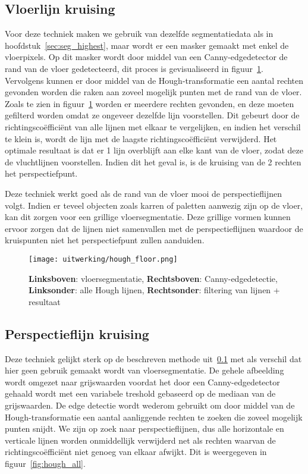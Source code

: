 \subsection{Vloerlijn kruising}\label{sec:hough_floor}
Voor deze techniek maken we gebruik van dezelfde segmentatiedata als in hoofdstuk~\ref{sec:seg_highest}, maar wordt er een masker gemaakt met enkel de vloerpixels.
Op dit masker wordt door middel van een Canny-edgedetector de rand van de vloer gedetecteerd, dit proces is gevisualiseerd in figuur~\ref{fig:hough_floor}.
Vervolgens kunnen er door middel van de Hough-transformatie een aantal rechten gevonden worden die raken aan zoveel mogelijk punten met de rand van de vloer.
Zoals te zien in figuur~\ref{fig:hough_floor} worden er meerdere rechten gevonden, en deze moeten gefilterd worden omdat ze ongeveer dezelfde lijn voorstellen.
Dit gebeurt door de richtingsco\"{e}ffici\"{e}nt van alle lijnen met elkaar te vergelijken, en indien het verschil te klein is, wordt de lijn met de laagste
richtingsco\"{e}ffici\"{e}nt verwijderd.
Het optimale resultaat is dat er 1 lijn overblijft aan elke kant van de vloer, zodat deze de vluchtlijnen voorstellen.
Indien dit het geval is, is de kruising van de 2 rechten het perspectiefpunt.

Deze techniek werkt goed als de rand van de vloer mooi de perspectieflijnen volgt.
Indien er teveel objecten zoals karren of paletten aanwezig zijn op de vloer, kan dit zorgen voor een grillige vloersegmentatie.
Deze grillige vormen kunnen ervoor zorgen dat de lijnen niet samenvallen met de perspectieflijnen waardoor de kruispunten niet het perspectiefpunt zullen aanduiden.

\begin{figure}
    \texttt{[image: uitwerking/hough\_floor.png]}
    \caption{\textbf{Linksboven}: vloersegmentatie, \textbf{Rechtsboven}: Canny-edgedetectie, \textbf{Linksonder}: alle Hough lijnen, \textbf{Rechtsonder}: filtering van lijnen + resultaat}
    \label{fig:hough_floor}
\end{figure}


\subsection{Perspectieflijn kruising}\label{sec:perspectieflijnkruising}
Deze techniek gelijkt sterk op de beschreven methode uit~\ref{sec:hough_floor} met als verschil dat hier geen gebruik gemaakt wordt van vloersegmentatie.
De gehele afbeelding wordt omgezet naar grijswaarden voordat het door een Canny-edgedetector gehaald wordt met een variabele treshold gebaseerd op de mediaan van de grijswaarden.
De edge detectie wordt wederom gebruikt om door middel van de Hough-transformatie een aantal aanliggende rechten te zoeken die zoveel mogelijk punten snijdt.
We zijn op zoek naar perspectieflijnen, dus alle horizontale en verticale lijnen worden onmiddellijk verwijderd net als rechten waarvan de richtingsco\"{e}ffici\"{e}nt
niet genoeg van elkaar afwijkt. Dit is weergegeven in figuur~\ref{fig:hough_all}.

